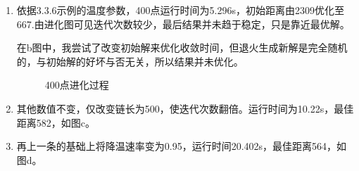 \documentclass[12pt]{article}
\begin{document}
\begin{enumerate}
	\item 依据3.3.6示例的温度参数，400点运行时间为5.296s，初始距离由2309优化至667.由进化图可见迭代次数较少，最后结果并未趋于稳定，只是靠近最优解。
	
	在b图中，我尝试了改变初始解来优化收敛时间，但退火生成新解是完全随机的，与初始解的好坏与否无关，所以结果并未优化。
\begin{figure}[htbp]
\centering
{}
\quad
{}
\quad
{}
\quad
{}
\caption{400点进化过程}
\end{figure}
\item 其他数值不变，仅改变链长为500，使迭代次数翻倍。运行时间为10.22s，最佳距离582，如图c。
\item 再上一条的基础上将降温速率变为0.95，运行时间20.402s，最佳距离564，如图d。
\end{enumerate}
\end{document}

